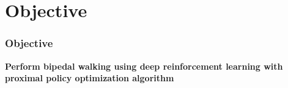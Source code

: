 \section{Objective}
\begin{frame}
	\frametitle{Objective}
	\centering
	\LARGE
	\bf
	Perform bipedal walking using deep reinforcement learning with proximal policy optimization algorithm
\end{frame}